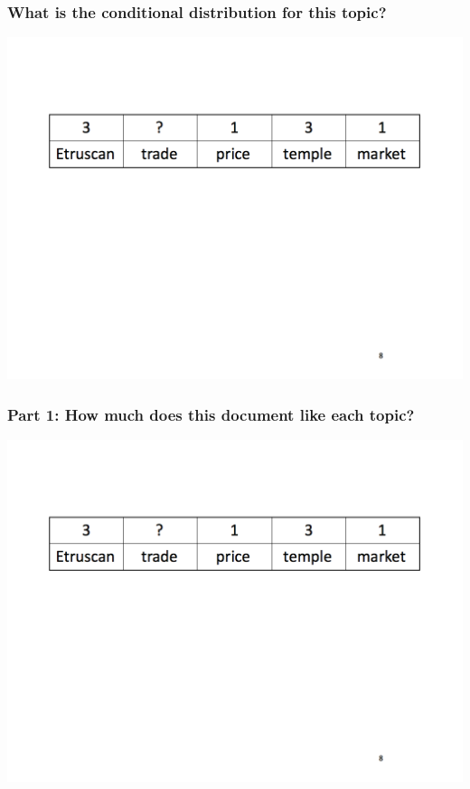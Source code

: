\documentclass[xcolor=dvipsnames]{beamer}
\begin{document}
\begin{frame}
  \frametitle{What is the conditional distribution for this topic?}
    \includegraphics[width=\linewidth]{topic_models/mimno_008}
\end{frame}


\begin{frame}
  \frametitle{Part 1: How much does this document like each topic?}
    \includegraphics[width=\linewidth]{topic_models/mimno_008}
\end{frame}
\end{document}
